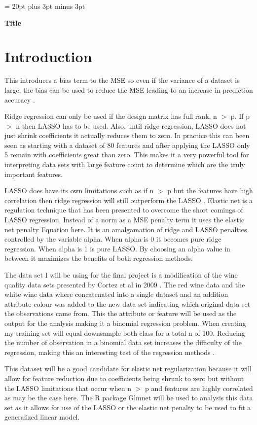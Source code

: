 \documentclass[10pt]{article}
\begin{document}
\baselineskip = 20pt plus 3pt minus 3pt

\centerline{\Large \bf Title} %
\bigskip

\section{Introduction}\label{sec:intro}
This introduces a bias term to the MSE so even if the variance of a dataset is large, the bias can be used to reduce the MSE leading to an increase in prediction accuracy \cite{1} .

Ridge regression can only be used if the design matrix has full rank, n  $ > $ p. If p $ > $ n then LASSO has to be used. Also, until ridge regression, LASSO does not just shrink coefficients it actually reduces them to zero. In practice this can been seen as starting with a dataset of 80 features and after applying the LASSO only 5 remain with coefficients great than zero.  This makes it a very powerful tool for interpreting data sets with large feature count to determine which are the truly important features. 

LASSO does have its own limitations such as if n $ > $ p but the features have high correlation then ridge regression will still outperform the LASSO \cite{2} . 
Elastic net is a regulation technique that has been presented to overcome the short comings of LASSO regression. Instead of a norm as a MSE penalty term it uses the elastic net penalty Equation here. It is an amalgamation of ridge and LASSO penalties controlled by the variable alpha. When alpha is 0 it becomes pure ridge regression. When alpha is 1 is pure LASSO. By choosing an alpha value in between it maximizes the benefits of both regression methods. 

The data set I will be using for the final project is a modification of the wine quality data sets presented by Cortez et al in 2009 \cite{3}. The red wine data and the white wine data where concatenated into a single dataset and an addition attribute colour was added to the new data set indicating which original data set the observations came from. This the attribute or feature will be used as the output for the analysis making it a binomial regression problem. When creating my training set will equal downsample both class for a total n of 100. Reducing the number of observation in a binomial data set increases the difficulty of the regression, making this an interesting test of the regression methods \cite{4}. 

This dataset will be a good candidate for elastic net regularization because it will allow for feature reduction due to coefficients being shrunk to zero but without the LASSO limitations that occur when n $ > $ p and features are highly correlated as may be the case here. The R package Glmnet will be used to analysis this data set as it allows for use of the LASSO or the elastic net penalty to be used to fit a generalized linear model.
\end{document}
